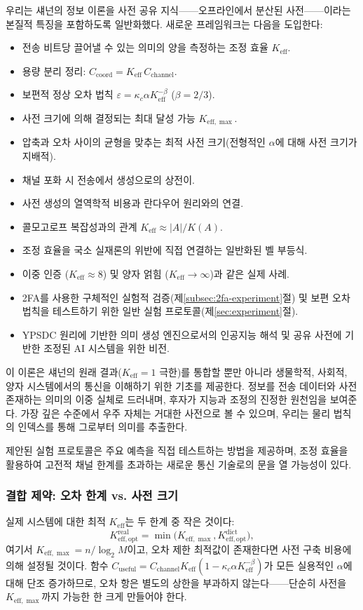 \documentclass[12pt,a4paper]{article}
\newcommand{\Keff}{K_{\mathrm{eff}}}
\newcommand{\Keffopt}{K_{\mathrm{eff},\mathrm{opt}}}
\newcommand{\Keffmax}{K_{\mathrm{eff},\max}}
\begin{document}
	우리는 섀넌의 정보 이론을 사전 공유 지식——오프라인에서 분산된 사전——이라는 본질적 특징을 포함하도록 일반화했다. 새로운 프레임워크는 다음을 도입한다:
	\begin{itemize}
		\item 전송 비트당 끌어낼 수 있는 의미의 양을 측정하는 조정 효율 $\Keff$.
		\item 용량 분리 정리: $C_{\text{coord}} = \Keff \, C_{\text{channel}}$.
		\item 보편적 정상 오차 법칙 $\varepsilon = \kappa_c\alpha K_{\mathrm{eff}}^{-\beta}$ ($\beta=2/3$).
		\item 사전 크기에 의해 결정되는 최대 달성 가능 $\Keffmax$.
		\item 압축과 오차 사이의 균형을 맞추는 최적 사전 크기(전형적인 $\alpha$에 대해 사전 크기가 지배적).
		\item 채널 포화 시 전송에서 생성으로의 상전이.
		\item 사전 생성의 열역학적 비용과 란다우어 원리와의 연결.
		\item 콜모고로프 복잡성과의 관계 $\Keff \approx |A|/K(A)$.
		\item 조정 효율을 국소 실재론의 위반에 직접 연결하는 일반화된 벨 부등식.
		\item 이중 인증 ($\Keff \approx 8$) 및 양자 얽힘 ($\Keff \to \infty$)과 같은 실제 사례.
		\item 2FA를 사용한 구체적인 실험적 검증(제\ref{subsec:2fa-experiment}절) 및 보편 오차 법칙을 테스트하기 위한 일반 실험 프로토콜(제\ref{sec:experiment}절).
		\item YPSDC 원리에 기반한 의미 생성 엔진으로서의 인공지능 해석 및 공유 사전에 기반한 조정된 AI 시스템을 위한 비전.
	\end{itemize}
	
	이 이론은 섀넌의 원래 결과($\Keff=1$ 극한)를 통합할 뿐만 아니라 생물학적, 사회적, 양자 시스템에서의 통신을 이해하기 위한 기초를 제공한다. 정보를 전송 데이터와 사전 존재하는 의미의 이중 실체로 드러내며, 후자가 지능과 조정의 진정한 원천임을 보여준다. 가장 깊은 수준에서 우주 자체는 거대한 사전으로 볼 수 있으며, 우리는 물리 법칙의 인덱스를 통해 그로부터 의미를 추출한다.
	
	제안된 실험 프로토콜은 주요 예측을 직접 테스트하는 방법을 제공하며, 조정 효율을 활용하여 고전적 채널 한계를 초과하는 새로운 통신 기술로의 문을 열 가능성이 있다.
	
	\subsubsection{결합 제약: 오차 한계 vs. 사전 크기}
	실제 시스템에 대한 최적 $\Keff$는 두 한계 중 작은 것이다:
	\[
	\Keffopt^{\text{real}} = \min\bigl( \Keffmax, \Keffopt^{\text{dict}} \bigr),
	\]
	여기서 $\Keffmax = n / \log_2 M$이고, 오차 제한 최적값이 존재한다면 사전 구축 비용에 의해 설정될 것이다. 함수 $C_{\text{useful}} = C_{\text{channel}} \Keff (1 - \kappa_c\alpha K_{\mathrm{eff}}^{-\beta})$가 모든 실용적인 $\alpha$에 대해 단조 증가하므로, 오차 항은 별도의 상한을 부과하지 않는다——단순히 사전을 $\Keffmax$까지 가능한 한 크게 만들어야 한다.
	
\end{document}
